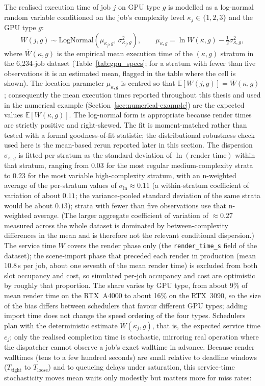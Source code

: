 {The realised execution time of job $j$ on GPU type $g$ is modelled as a log-normal random variable conditioned on the job's complexity level $\kappa_j \in \{1,2,3\}$ and the GPU type $g$:
\begin{equation}
W(j,g) \sim \text{LogNormal}\!\left(\mu_{\kappa_j,g},\, \sigma_{\kappa_j,g}^2\right),
\qquad
\mu_{\kappa,g} = \ln \overline{W}(\kappa,g) - \tfrac{1}{2}\sigma_{\kappa,g}^2,
\label{eq:lognormal}
\end{equation}
where $\overline{W}(\kappa,g)$ is the empirical mean execution time of the $(\kappa,g)$ stratum in the 6{,}234-job dataset (Table~\ref{tab:gpu_specs}; for a stratum with fewer than five observations it is an estimated mean, flagged in the table where the cell is shown). The location parameter $\mu_{\kappa,g}$ is centred so that $\mathbb{E}[W(j,g)] = \overline{W}(\kappa,g)$; consequently the mean execution times reported throughout this thesis and used in the numerical example (Section~\ref{sec:numerical-example}) are the expected values $\mathbb{E}[W(\kappa,g)]$. The log-normal form is appropriate because render times are strictly positive and right-skewed. The fit is moment-matched rather than tested with a formal goodness-of-fit statistic; the distributional robustness check used here is the mean-based rerun reported later in this section. The dispersion $\sigma_{\kappa,g}$ is fitted per stratum as the standard deviation of $\ln(\text{render time})$ within that stratum, ranging from $0.03$ for the most regular medium-complexity strata to $0.23$ for the most variable high-complexity stratum, with an n-weighted average of the per-stratum values of $\sigma_{\ln} \approx 0.11$ (a within-stratum coefficient of variation of about $0.11$; the variance-pooled standard deviation of the same strata would be about $0.13$); strata with fewer than five observations use that n-weighted average. (The larger aggregate coefficient of variation of $\approx 0.27$ measured across the whole dataset is dominated by between-complexity differences in the mean and is therefore not the relevant conditional dispersion.) The service time $W$ covers the render phase only (the \texttt{render\_time\_s} field of the dataset); the scene-import phase that preceded each render in production (mean 10.8\,s per job, about one seventh of the mean render time) is excluded from both slot occupancy and cost, so simulated per-job occupancy and cost are optimistic by roughly that proportion. The share varies by GPU type, from about 9\% of mean render time on the RTX~A4000 to about 16\% on the RTX~3090, so the size of the bias differs between schedulers that favour different GPU types; adding import time does not change the speed ordering of the four types. Schedulers plan with the deterministic estimate $\overline{W}(\kappa_j,g)$, that is, the expected service time $e_j$; only the realised completion time is stochastic, mirroring real operation where the dispatcher cannot observe a job's exact walltime in advance. Because render walltimes (tens to a few hundred seconds) are small relative to deadline windows ($T_{\text{tight}}$ to $T_{\text{loose}}$) and to queueing delays under saturation, this service-time stochasticity moves mean waits only modestly but matters more for miss rates: }
